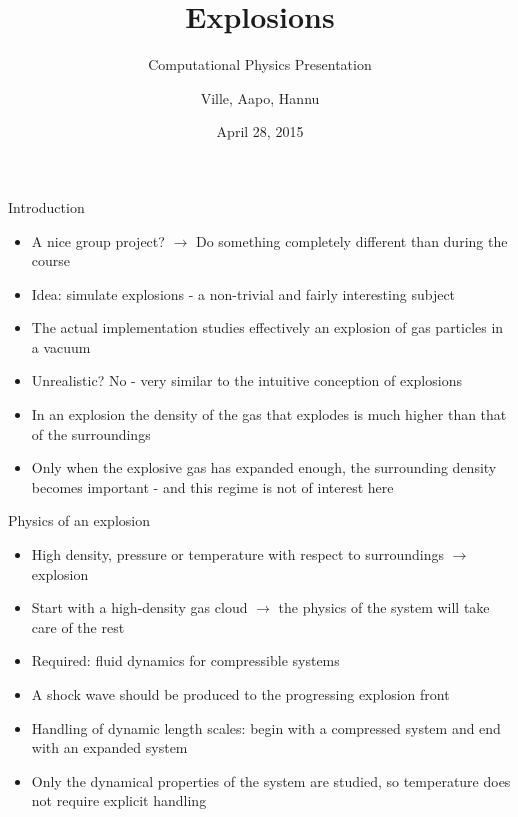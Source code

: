 \documentclass{beamer}
\title[Explosions]{Explosions}
\subtitle{Computational Physics Presentation}
\author{Ville, Aapo, Hannu}
\date{April 28, 2015}
\begin{document}
\begin{frame}
\titlepage
\end{frame}

\begin{frame}{Introduction}
\begin{itemize}

\item A nice group project? $\rightarrow$ Do something completely different than during the course
\item Idea: simulate explosions - a non-trivial and fairly interesting subject
\item The actual implementation studies effectively an explosion of gas particles in a vacuum
\item Unrealistic? No - very similar to the intuitive conception of explosions
\item In an explosion the density of the gas that explodes is much higher than that of the surroundings
\item Only when the explosive gas has expanded enough, the surrounding density becomes important - and this regime is not of interest here

\end{itemize}
\end{frame}


\begin{frame}{Physics of an explosion}
\begin{itemize}

\item High density, pressure or temperature with respect to surroundings $\rightarrow$ explosion
\item Start with a high-density gas cloud $\rightarrow$ the physics of the system will take care of the rest
\item Required: fluid dynamics for compressible systems
\item A shock wave should be produced to the progressing explosion front
\item Handling of dynamic length scales: begin with a compressed system and end with an expanded system
\item Only the dynamical properties of the system are studied, so temperature does not require explicit handling

\end{itemize}
\end{frame}
\end{document}
